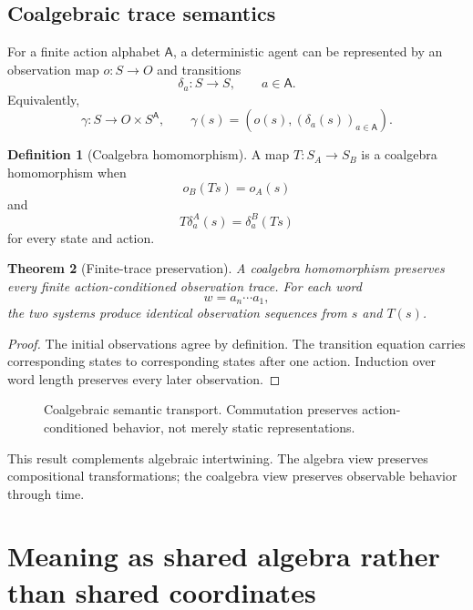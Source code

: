 \documentclass[11pt]{article}
\newtheorem{theorem}{Theorem}[section]
\theoremstyle{definition}
\newtheorem{definition}[theorem]{Definition}
\theoremstyle{remark}
\begin{document}
\subsection{Coalgebraic trace semantics}

For a finite action alphabet \(\mathsf A\), a deterministic agent can be represented by an observation map \(o:S\to O\) and transitions
\[
\delta_a:S\to S,
\qquad a\in\mathsf A.
\]
Equivalently,
\[
\gamma:S\to O\times S^{\mathsf A},
\qquad
\gamma(s)=\left(o(s),(\delta_a(s))_{a\in\mathsf A}\right).
\]

\begin{definition}[Coalgebra homomorphism]
A map \(T:S_A\to S_B\) is a coalgebra homomorphism when
\[
o_B(Ts)=o_A(s)
\]
and
\[
T\delta^A_a(s)=\delta^B_a(Ts)
\]
for every state and action.
\end{definition}

\begin{theorem}[Finite-trace preservation]
A coalgebra homomorphism preserves every finite action-conditioned observation trace. For each word
\[
w=a_n\cdots a_1,
\]
the two systems produce identical observation sequences from \(s\) and \(T(s)\).
\end{theorem}

\begin{proof}
The initial observations agree by definition. The transition equation carries corresponding states to corresponding states after one action. Induction over word length preserves every later observation.
\end{proof}

\begin{figure}[ht]
\centering
{}
\caption{Coalgebraic semantic transport. Commutation preserves action-conditioned behavior, not merely static representations.}
\label{fig:coalgebra}
\end{figure}

This result complements algebraic intertwining. The algebra view preserves compositional transformations; the coalgebra view preserves observable behavior through time.

\section{Meaning as shared algebra rather than shared coordinates}
\end{document}
